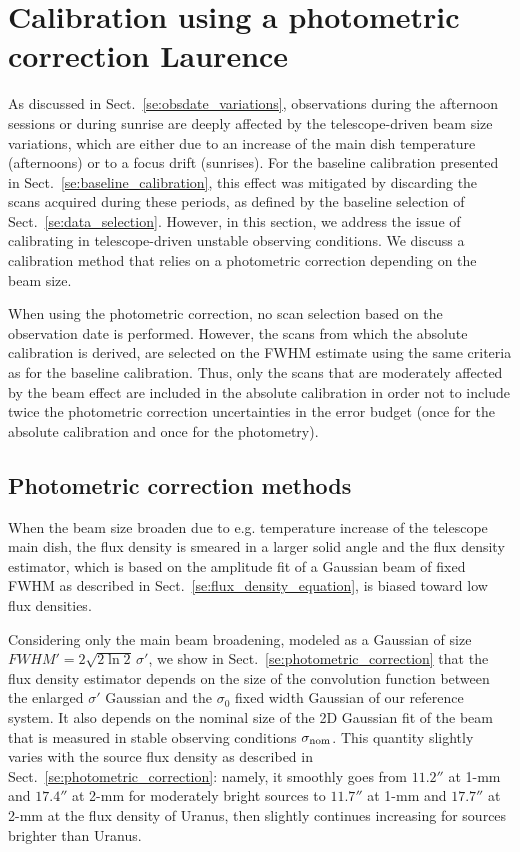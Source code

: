 \section{Calibration using a photometric correction {\color{blue} Laurence} }
\label{se:photocorr_calibration}

As discussed in Sect.~\ref{se:obsdate_variations}, observations during the
afternoon sessions or
during sunrise
are deeply affected by the telescope-driven beam
size variations, which are either due to an increase of the main dish
temperature (afternoons) or to a focus drift (sunrises).
For the baseline calibration presented in
Sect.~\ref{se:baseline_calibration}, this effect was mitigated by
discarding the scans acquired during these periods, as defined by the
baseline selection of Sect.~\ref{se:data_selection}. However, in
this section, we address the issue of calibrating in
telescope-driven unstable observing conditions. We discuss a
calibration method that relies on a photometric correction
depending on the beam size. 

When using the photometric correction, no scan selection based on the
observation date is performed. However, the scans from which the
absolute calibration is derived, are selected on the FWHM estimate
using the same criteria as for the baseline calibration. Thus, only
the scans that are moderately affected by the beam effect are included
in the absolute calibration in order not to include twice the
photometric correction uncertainties in the error budget (once for the
absolute calibration and once for the photometry).


\subsection{Photometric correction methods}
\label{se:photocorr_methods}

When the beam size broaden due to e.g. temperature increase of the
telescope main dish, the flux density is smeared in a larger solid angle and
the flux density estimator, which is based on the amplitude fit of a
Gaussian beam of fixed FWHM as described in
Sect.~\ref{se:flux_density_equation}, is biased toward low flux densities.

Considering only the main beam broadening, modeled as a Gaussian of
size $FWHM' = 2 \sqrt{2\ln{2}} \, \sigma '$, we show in
Sect.~\ref{se:photometric_correction} that
the flux density estimator depends on the size of the convolution
function between the enlarged $\sigma '$ Gaussian and the 
$\sigma_0$ fixed width Gaussian of our reference system. It also
depends on the nominal size of the 2D Gaussian fit of the beam that is
measured in stable observing conditions $\sigma_{\rm{nom}}$. This quantity
slightly varies with the source flux density as described in
Sect.~\ref{se:photometric_correction}: namely, it smoothly goes from
$11.2''$ at 1-mm and $17.4''$ at 2-mm for moderately bright sources to
$11.7''$ at 1-mm and $17.7''$ at 2-mm at the flux density of Uranus,
then slightly continues increasing for sources brighter than Uranus.  


